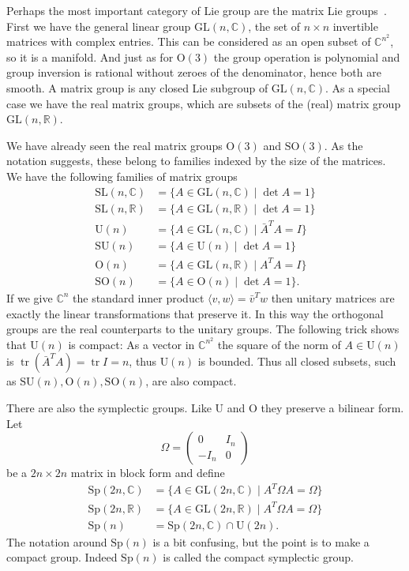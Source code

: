\documentclass[twoside,11pt,a4paper,leqno]{article}
\numberwithin{equation}{section}
\theoremstyle{plain}
\theoremstyle{definition}
\DeclareMathOperator{\tr}{tr}
\newcommand{\bbC}{\mathbb{C}}
\newcommand{\bbR}{\mathbb{R}}
\newcommand{\GL}{\mathrm{GL}}
\newcommand{\SL}{\mathrm{SL}}
\newcommand{\U}{\mathrm{U}}
\newcommand{\SU}{\mathrm{SU}}
\renewcommand{\O}{\mathrm{O}}
\newcommand{\SO}{\mathrm{SO}}
\newcommand{\Sp}{\mathrm{Sp}}
\begin{document}
Perhaps the most important category of Lie group are the matrix Lie groups~\cite[Definition~1.4]{Hall2015}.
First we have the general linear group $\GL(n,\bbC)$, the set of $n\times n$ invertible matrices with complex entries.
This can be considered as an open subset of $\bbC^{n^2}$, so it is a manifold. And just as for $\O(3)$ the group operation is polynomial and group inversion is rational without zeroes of the denominator, hence both are smooth.
A matrix group is any closed Lie subgroup of $\GL(n,\bbC)$.
As a special case we have the real matrix groups, which are subsets of the (real) matrix group $\GL(n,\bbR)$.

We have already seen the real matrix groups $\O(3)$ and $\SO(3)$.
As the notation suggests, these belong to families indexed by the size of the matrices.
We have the following families of matrix groups
\begin{align*}
\SL(n,\bbC) &= \{ A \in \GL(n,\bbC) \mid \det A = 1 \} \\
\SL(n,\bbR) &= \{ A \in \GL(n,\bbR) \mid \det A = 1 \} \\
\U(n) &= \{ A \in \GL(n,\bbC) \mid \bar{A}^T A = I \} \\
\SU(n) &= \{ A \in \U(n) \mid \det A = 1 \} \\
\O(n) &= \{ A \in \GL(n,\bbR) \mid A^T A = I \} \\
\SO(n) &= \{ A \in \O(n) \mid \det A = 1 \}.
\end{align*}
If we give $\bbC^n$ the standard inner product $\langle v,w \rangle = \bar{v}^Tw$ then unitary matrices are exactly the linear transformations that preserve it.
In this way the orthogonal groups are the real counterparts to the unitary groups.
The following trick shows that $\U(n)$ is compact: As a vector in $\bbC^{n^2}$ the square of the norm of $A \in \U(n)$ is $\tr(\bar{A}^T A) = \tr I = n$, thus $\U(n)$ is bounded.
Thus all closed subsets, such as $\SU(n), \O(n),\SO(n)$, are also compact.

There are also the symplectic groups.
Like $\U$ and $\O$ they preserve a bilinear form.
Let 
\[
\Omega = \begin{pmatrix}
0 & I_n \\ - I_n & 0
\end{pmatrix}
\]
be a $2n\times 2n$ matrix in block form and define
\begin{align*}
\Sp(2n,\bbC) &= \{ A \in \GL(2n,\bbC) \mid A^T\Omega A = \Omega \} \\
\Sp(2n,\bbR) &= \{ A \in \GL(2n,\bbR) \mid A^T\Omega A = \Omega \} \\
\Sp(n) &= \Sp(2n,\bbC) \cap \U(2n).
\end{align*}
The notation around $\Sp(n)$ is a bit confusing, but the point is to make a compact group.
Indeed $\Sp(n)$ is called the compact symplectic group.
\end{document}
